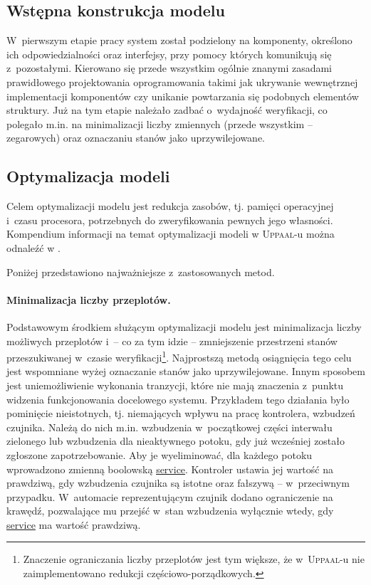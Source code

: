 \documentclass{pracamgr}
\newcommand{\upp}{\textsc{Uppaal}}
\theoremstyle{plain}
\begin{document}
\subsection{Wstępna konstrukcja modelu}

W~pierwszym etapie pracy system został podzielony na komponenty,
określono ich odpowiedzialności oraz interfejsy, przy pomocy których
komunikują się z~pozostałymi. Kierowano się przede wszystkim ogólnie
znanymi zasadami prawidłowego projektowania oprogramowania takimi jak
ukrywanie wewnętrznej implementacji komponentów czy unikanie
powtarzania się podobnych elementów struktury. Już na tym etapie
należało zadbać o~wydajność weryfikacji, co polegało m.in. na
minimalizacji liczby zmiennych (przede wszystkim -- zegarowych) oraz
oznaczaniu stanów jako uprzywilejowane.

\subsection{Optymalizacja modeli}
\label{s:models:opt}

Celem optymalizacji modelu jest redukcja zasobów, tj. pamięci
operacyjnej i~czasu procesora, potrzebnych do zweryfikowania pewnych
jego własności. Kompendium informacji na temat optymalizacji modeli w
\upp-u można odnaleźć w \cite{tutorial04}.

Poniżej przedstawiono najważniejsze z~zastosowanych metod.

\paragraph{Minimalizacja liczby przeplotów.} Podstawowym środkiem
służącym optymalizacji modelu jest minimalizacja liczby możliwych
przeplotów i~-- co za tym idzie -- zmniejszenie przestrzeni stanów
przeszukiwanej w~czasie weryfikacji\footnote{Znaczenie ograniczania
  liczby przeplotów jest tym większe, że w~\upp-u nie zaimplementowano
  redukcji częściowo-porządkowych.}. Najprostszą metodą osiągnięcia
tego celu jest wspomniane wyżej oznaczanie stanów jako uprzywilejowane.
Innym sposobem jest uniemożliwienie wykonania tranzycji, które nie
mają znaczenia z~punktu widzenia funkcjonowania docelowego
systemu. Przykładem tego działania było pominięcie nieistotnych,
tj. niemających wpływu na pracę kontrolera, wzbudzeń czujnika. Należą
do nich m.in. wzbudzenia w~początkowej części interwału zielonego lub
wzbudzenia dla nieaktywnego potoku, gdy już wcześniej zostało
zgłoszone zapotrzebowanie. Aby je wyeliminować, dla każdego potoku
wprowadzono zmienną boolowską \url{service}. Kontroler ustawia
jej wartość na prawdziwą, gdy wzbudzenia czujnika są istotne oraz
fałszywą -- w~przeciwnym przypadku. W~automacie reprezentującym
czujnik dodano ograniczenie na krawędź, pozwalające mu przejść w~stan
wzbudzenia wyłącznie wtedy, gdy \url{service} ma wartość prawdziwą.
\end{document}
